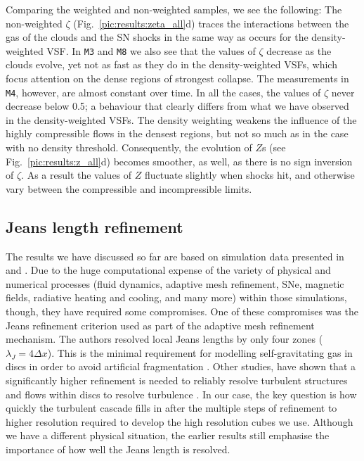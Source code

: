 \documentclass{aa}		%
\begin{document}
Comparing the weighted and non-weighted samples, we see the following:
The non-weighted $\zeta$ (Fig.~\ref{pic:results:zeta_all}d) traces the interactions between the gas of the clouds and the SN shocks in the same way as occurs for the density-weighted VSF.
In \texttt{M3} and \texttt{M8} we also see that the values of $\zeta$ decrease as the clouds evolve, yet not as fast as they do in the density-weighted VSFs, which focus attention on the dense regions of strongest collapse. 
The measurements in \texttt{M4}, however, are almost constant over time. 
In all the cases, the values of $\zeta$ never decrease below 0.5; a behaviour that clearly differs from what we have observed in the density-weighted VSFs. 
The density weighting weakens the influence of the highly compressible flows in the densest regions, but not so much as in the case with no density threshold. 
Consequently, the evolution of $Z$s (see Fig.~\ref{pic:results:z_all}d) becomes smoother, as well, as there is no sign inversion of $\zeta$.
As a result the values of $Z$ fluctuate slightly when shocks hit, and otherwise vary between the compressible and incompressible limits.



\subsection{Jeans length refinement}\label{results:refinement}

The results we have discussed so far are based on simulation data presented in  and .
Due to the huge computational expense of the variety of physical and numerical processes (fluid dynamics, adaptive mesh refinement, SNe, magnetic fields, radiative heating and cooling, and many more) within those simulations, though, they have required some compromises.
One of these compromises was the Jeans refinement criterion used as part of the adaptive mesh refinement mechanism.
The authors resolved local Jeans lengths by only four zones ($\lambda_J=4\Delta x$).
This is the minimal requirement for modelling self-gravitating gas in discs in order to avoid artificial fragmentation \citep{Truelove1998}. 
Other studies, have shown that a significantly higher refinement is needed to reliably resolve turbulent structures and flows within discs to resolve turbulence \citep{Federrath2011, Turk2012}.  
In our case, the key question is how quickly the turbulent cascade fills in after the multiple steps of refinement to higher resolution required to develop the high resolution cubes we use.  
Although we have a different physical situation, the earlier results still emphasise the importance of how well the Jeans length is resolved.
\end{document}
